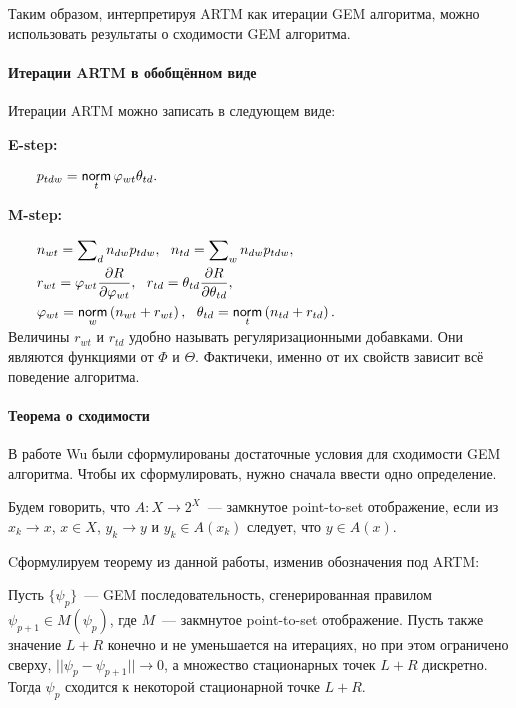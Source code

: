 \documentclass[12pt, twoside]{article}
\begin{document}
 Таким образом, интерпретируя ARTM как итерации GEM алгоритма, можно использовать результаты о сходимости GEM алгоритма.

\paragraph{Итерации ARTM в обобщённом виде}	  
Итерации ARTM можно записать в следующем виде: 

\textbf{E-step:}   
 
$
\begin{aligned}
\qquad& p_{tdw} = \mathop{\mathsf{norm}}\limits_t \varphi_{wt} \theta_{td}.
\end{aligned}
$\medskip

\textbf{M-step:}

$
\begin{aligned}    
\qquad& n_{wt} = \sum\nolimits_{d} n_{dw} p_{tdw},~~n_{td} = \sum\nolimits_{w} n_{dw} p_{tdw},\\    
\qquad& r_{wt} =  \varphi_{wt}\frac{\partial R}{\partial\varphi_{wt}},~~ r_{td} =  \theta_{td}\frac{\partial R}{\partial\theta_{td}},\\
\qquad& \varphi_{wt}  = \mathop{\mathsf{norm}}\limits_w \left(n_{wt} + r_{wt} \right),~~\theta_{td} = \mathop{\mathsf{norm}}\limits_t  \left(n_{td} + r_{td}\right).\\
\end{aligned}
$\medskip\\
Величины $r_{wt}$ и $r_{td}$ удобно называть регуляризационными добавками. Они являются функциями от $\Phi$ и $\Theta$. Фактичеки, именно от их свойств зависит всё поведение алгоритма.


\paragraph{Теорема о сходимости}

 В работе Wu \cite{wu1983convergence} были сформулированы достаточные условия для сходимости GEM алгоритма. Чтобы их сформулировать, нужно сначала ввести одно определение.
\begin{Definition}
Будем говорить, что $A\colon X \to 2^X$~--- замкнутое point-to-set отображение, если из $x_k \to x$, $x \in X$, $y_k \to y$ и $y_k \in A(x_k)$ следует, что $y \in A(x)$.
\end{Definition}

Cформулируем теорему из данной работы, изменив обозначения под ARTM:
\begin{Theorem} \label{Theorem_wu} 
Пусть $\{\psi_p\}$~--- GEM последовательность, сгенерированная правилом $\psi_{p+1} \in M(\psi_p)$, где $M$~--- закмнутое point-to-set отображение. Пусть также значение $L +  R$ конечно и не уменьшается на итерациях, но при этом ограничено сверху, $|| \psi_p - \psi_{p+1}|| \to 0$, а множество стационарных точек $L +  R$ дискретно. Тогда $\psi_p$ сходится к некоторой стационарной точке $L +  R$.
\end{Theorem}
\end{document}
